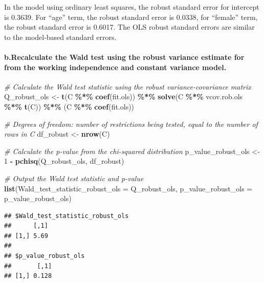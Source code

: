 \documentclass[
]{article}
\newenvironment{Shaded}{\begin{snugshade}}{\end{snugshade}}
\newcommand{\AttributeTok}[1]{\textcolor[rgb]{0.13,0.29,0.53}{#1}}
\newcommand{\CommentTok}[1]{\textcolor[rgb]{0.56,0.35,0.01}{\textit{#1}}}
\newcommand{\DecValTok}[1]{\textcolor[rgb]{0.00,0.00,0.81}{#1}}
\newcommand{\FunctionTok}[1]{\textcolor[rgb]{0.13,0.29,0.53}{\textbf{#1}}}
\newcommand{\NormalTok}[1]{#1}
\newcommand{\OtherTok}[1]{\textcolor[rgb]{0.56,0.35,0.01}{#1}}
\newcommand{\SpecialCharTok}[1]{\textcolor[rgb]{0.81,0.36,0.00}{\textbf{#1}}}
\begin{document}
In the model using ordinary least squares, the robust standard error for
intercept is 0.3639. For ``age'' term, the robust standard error is
0.0338, for ``female'' term, the robust standard error is 0.6017. The
OLS robust standard errors are similar to the model-based standard
errors.

\hypertarget{b.recalculate-the-wald-test-using-the-robust-variance-estimate-for-from-the-working-independence-and-constant-variance-model.}{%
\paragraph{b.Recalculate the Wald test using the robust variance
estimate for from the working independence and constant variance
model.}\label{b.recalculate-the-wald-test-using-the-robust-variance-estimate-for-from-the-working-independence-and-constant-variance-model.}}

\begin{Shaded}
\begin{Highlighting}[]
\CommentTok{\# Calculate the Wald test statistic using the robust variance{-}covariance matrix}
\NormalTok{Q\_robust\_ols }\OtherTok{\textless{}{-}} \FunctionTok{t}\NormalTok{(C }\SpecialCharTok{\%*\%} \FunctionTok{coef}\NormalTok{(fit.ols)) }\SpecialCharTok{\%*\%} \FunctionTok{solve}\NormalTok{(C }\SpecialCharTok{\%*\%}\NormalTok{ vcov.rob.ols }\SpecialCharTok{\%*\%} \FunctionTok{t}\NormalTok{(C)) }\SpecialCharTok{\%*\%}\NormalTok{ (C }\SpecialCharTok{\%*\%} \FunctionTok{coef}\NormalTok{(fit.ols))}

\CommentTok{\# Degrees of freedom: number of restrictions being tested, equal to the number of rows in C}
\NormalTok{df\_robust }\OtherTok{\textless{}{-}} \FunctionTok{nrow}\NormalTok{(C)}

\CommentTok{\# Calculate the p{-}value from the chi{-}squared distribution}
\NormalTok{p\_value\_robust\_ols }\OtherTok{\textless{}{-}} \DecValTok{1} \SpecialCharTok{{-}} \FunctionTok{pchisq}\NormalTok{(Q\_robust\_ols, df\_robust)}

\CommentTok{\# Output the Wald test statistic and p{-}value}
\FunctionTok{list}\NormalTok{(}\AttributeTok{Wald\_test\_statistic\_robust\_ols =}\NormalTok{ Q\_robust\_ols, }\AttributeTok{p\_value\_robust\_ols =}\NormalTok{ p\_value\_robust\_ols)}
\end{Highlighting}
\end{Shaded}

\begin{verbatim}
## $Wald_test_statistic_robust_ols
##      [,1]
## [1,] 5.69
## 
## $p_value_robust_ols
##       [,1]
## [1,] 0.128
\end{verbatim}
\end{document}

